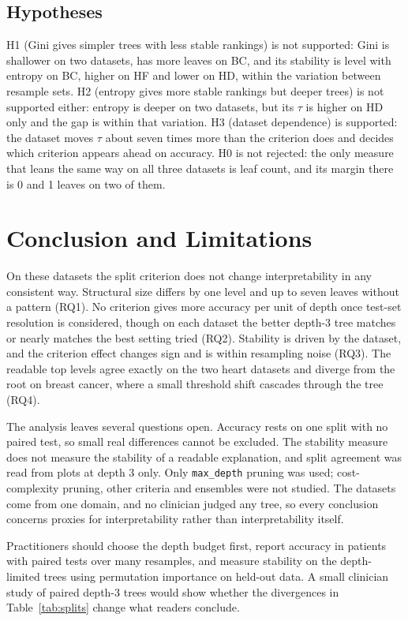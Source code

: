 \documentclass[conference,10pt]{IEEEtran}
\begin{document}
\subsection{Hypotheses}
H1 (Gini gives simpler trees with less stable rankings) is not supported: Gini is shallower on two datasets, has more leaves on BC, and its stability is level with entropy on BC, higher on HF and lower on HD, within the variation between resample sets. H2 (entropy gives more stable rankings but deeper trees) is not supported either: entropy is deeper on two datasets, but its $\tau$ is higher on HD only and the gap is within that variation. H3 (dataset dependence) is supported: the dataset moves $\tau$ about seven times more than the criterion does and decides which criterion appears ahead on accuracy. H0 is not rejected: the only measure that leans the same way on all three datasets is leaf count, and its margin there is 0 and 1 leaves on two of them.

\section{Conclusion and Limitations}
On these datasets the split criterion does not change interpretability in any consistent way. Structural size differs by one level and up to seven leaves without a pattern (RQ1). No criterion gives more accuracy per unit of depth once test-set resolution is considered, though on each dataset the better depth-3 tree matches or nearly matches the best setting tried (RQ2). Stability is driven by the dataset, and the criterion effect changes sign and is within resampling noise (RQ3). The readable top levels agree exactly on the two heart datasets and diverge from the root on breast cancer, where a small threshold shift cascades through the tree (RQ4).

The analysis leaves several questions open. Accuracy rests on one split with no paired test, so small real differences cannot be excluded. The stability measure does not measure the stability of a readable explanation, and split agreement was read from plots at depth 3 only. Only \texttt{max\_depth} pruning was used; cost-complexity pruning, other criteria and ensembles were not studied. The datasets come from one domain, and no clinician judged any tree, so every conclusion concerns proxies for interpretability rather than interpretability itself.

Practitioners should choose the depth budget first, report accuracy in patients with paired tests over many resamples, and measure stability on the depth-limited trees using permutation importance on held-out data. A small clinician study of paired depth-3 trees would show whether the divergences in Table~\ref{tab:splits} change what readers conclude.

\clearpage
\label{paper:references}


\end{document}
